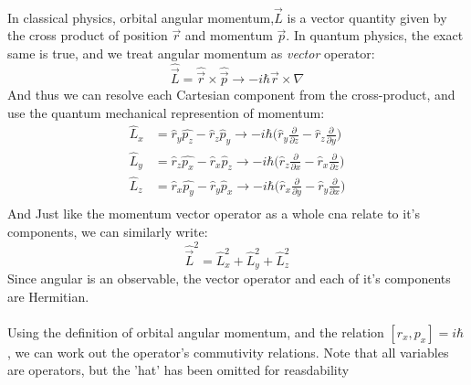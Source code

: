 \documentclass[12pt,letterpaper]{book}
\begin{document}
\paragraph*{}In classical physics, orbital angular momentum,$\vec{L}$ is a vector quantity given by the cross product of position $\vec{r}$ and momentum $\vec{p}$. In quantum physics, the exact same is true, and we treat angular momentum as \textit{vector} operator:
\begin{equation}
\label{orbit angular momentum}
\hat{\vec{L}} = \hat{\vec{r}} \times \hat{\vec{p}} \rightarrow -i\hbar \vec{r} \times \nabla
\end{equation}
And thus we can resolve each Cartesian component from the cross-product, and use the quantum mechanical represention of momentum:
\begin{equation}
\label{Lx Ly Lz}
\begin{split}
\hat{L}_x &= \hat{r}_y\hat{p_z} - \hat{r}_z\hat{p}_y \rightarrow 
-i\hbar \big(\hat{r}_y\frac{\partial}{\partial z} - \hat{r}_z\frac{\partial}{\partial y} \big) \\
\hat{L}_y &= \hat{r}_z\hat{p_x} - \hat{r}_x\hat{p}_z \rightarrow
-i\hbar \big(\hat{r}_z\frac{\partial}{\partial x} - \hat{r}_x\frac{\partial}{\partial z} \big) \\
\hat{L}_z &= \hat{r}_x\hat{p_y} - \hat{r}_y\hat{p}_x  \rightarrow
-i\hbar \big(\hat{r}_x\frac{\partial}{\partial y} - \hat{r}_y\frac{\partial}{\partial x} \big) \\
\end{split}
\end{equation}
And Just like the momentum vector operator as a whole cna relate to it's components, we can similarly write:
\begin{equation}
\hat{\vec{L}}^2 = \hat{L}_x^2 + \hat{L}_y^2 + \hat{L}_z^2
\end{equation}
Since angular is an observable, the vector operator and each of it's components are Hermitian.

\paragraph*{}Using the definition of orbital angular momentum, and the relation $[r_x,p_x] = i\hbar$, we can work out the operator's commutivity relations. Note that all variables are operators, but the 'hat' has been omitted for reasdability
\end{document}
